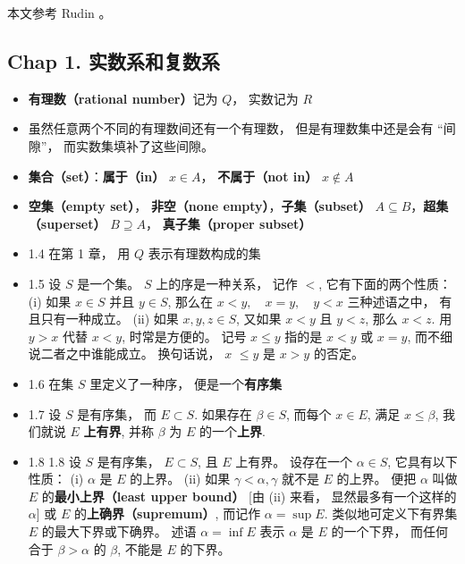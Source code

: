 

本文参考 Rudin \cite{Rudin}。

\subsection{Chap 1. 实数系和复数系}

\begin{itemize}
\item \textbf{有理数（rational number）}记为 $Q$， 实数记为 $R$

\item 虽然任意两个不同的有理数间还有一个有理数， 但是有理数集中还是会有 “间隙”， 而实数集填补了这些间隙。

\item \textbf{集合（set）}：\textbf{属于（in）} $x \in A$， \textbf{不属于（not in）} $x \notin A$

\item \textbf{空集（empty set）}， \textbf{非空（none empty）}，\textbf{子集（subset）} $A \subseteq B$，\textbf{超集（superset）} $B \supseteq A$， \textbf{真子集（proper subset）}

\item 1.4 在第 1 章， 用 $Q$ 表示有理数构成的集

\item 1.5 设 $S$ 是一个集。 $S$ 上的序是一种关系， 记作 $<$, 它有下面的两个性质： (i) 如果 $x \in S$ 并且 $y \in S$, 那么在 $x<y, \quad x=y, \quad y<x$ 三种述语之中， 有且只有一种成立。 (ii) 如果 $x, y, z \in S$, 又如果 $x<y$ 且 $y<z$, 那么 $x<z$. 用 $y>x$ 代替 $x<y$, 时常是方便的。 记号 $x \leqslant y$ 指的是 $x<y$ 或 $x=y$, 而不细说二者之中谁能成立。 换句话说， $x$ $\leqslant y$ 是 $x>y$ 的否定。

\item 1.6 在集 $S$ 里定义了一种序， 便是一个\textbf{有序集}

\item 1.7 设 $S$ 是有序集， 而 $E \subset S$. 如果存在 $\beta \in S$, 而每个 $x \in E$, 满足 $x \leqslant \beta$, 我们就说 $E$ \textbf{上有界}, 并称 $\beta$ 为 $E$ 的一个\textbf{上界}.

\item 1.8 1.8 设 $S$ 是有序集， $E \subset S$, 且 $E$ 上有界。 设存在一个 $\alpha \in S$, 它具有以下性质： (i) $\alpha$ 是 $E$ 的上界。 (ii) 如果 $\gamma<\alpha, \gamma$ 就不是 $E$ 的上界。 便把 $\alpha$ 叫做 $E$ 的\textbf{最小上界（least upper bound）} [由 (ii) 来看， 显然最多有一个这样的 $\alpha$] 或 $E$ 的\textbf{上确界（supremum）}, 而记作 $\alpha=\sup E$. 类似地可定义下有界集 $E$ 的最大下界或下确界。 述语 $\alpha=\inf E$ 表示 $\alpha$ 是 $E$ 的一个下界， 而任何合于 $\beta>\alpha$ 的 $\beta$, 不能是 $E$ 的下界。


\end{itemize}
